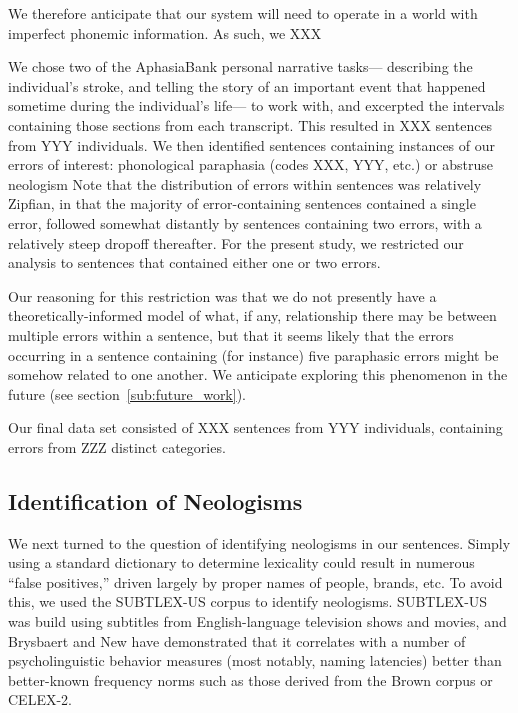 We therefore anticipate that our system will need to operate in a world with imperfect phonemic information.
As such, we XXX %

We chose two of the AphasiaBank personal narrative tasks--- describing the individual's stroke, and telling the story of an important event that happened sometime during the individual's life--- to work with, and excerpted the intervals containing those sections from each transcript.
This resulted in XXX sentences from YYY individuals. %
We then identified sentences containing instances of our errors of interest: phonological paraphasia (codes XXX, YYY, etc.) or abstruse neologism %
Note that the distribution of errors within sentences was relatively Zipfian, in that the majority of error-containing sentences contained a single error, followed somewhat distantly by sentences containing two errors, with a relatively steep dropoff thereafter.
For the present study, we restricted our analysis to sentences that contained either one or two errors.

Our reasoning for this restriction was that we do not presently have a theoretically-informed model of what, if any, relationship there may be between multiple errors within a sentence, but that it seems likely that the errors occurring in a sentence containing (for instance) five paraphasic errors might be somehow related to one another.
We anticipate exploring this phenomenon in the future (see section~\ref{sub:future_work}).

Our final data set consisted of XXX sentences from YYY individuals, containing errors from ZZZ distinct categories. %


\subsection{Identification of Neologisms} %
\label{sub:identification_of_neologisms}

We next turned to the question of identifying neologisms in our sentences.
Simply using a standard dictionary to determine lexicality could result in numerous ``false positives,'' driven largely by proper names of people, brands, etc.
To avoid this, we used the SUBTLEX-US corpus \cite{Brysbaert:2009du} to identify neologisms. SUBTLEX-US was build using subtitles from English-language television shows and movies, and Brysbaert and New have demonstrated that it correlates with a number of psycholinguistic behavior measures (most notably, naming latencies) better than better-known frequency norms such as those derived from the Brown corpus or CELEX-2.

